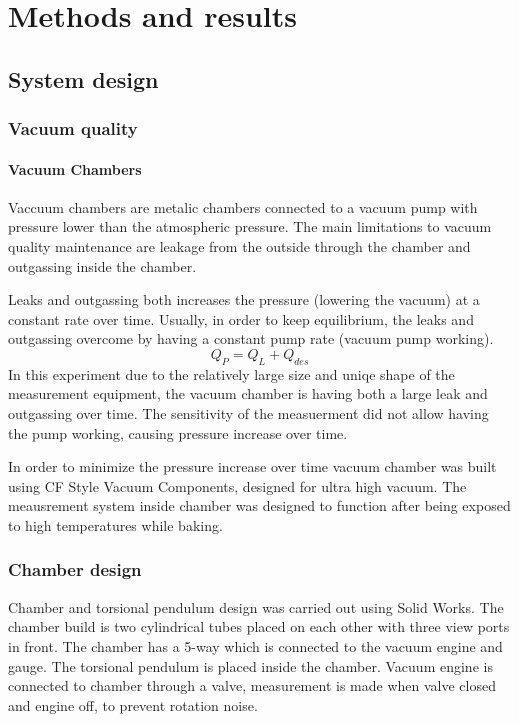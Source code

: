 \documentclass[\main/master.tex]{subfiles}
\begin{document}
\chapter{Methods and results}\label{chp:example-2}
\section{System design}
\subsection{Vacuum quality}

\subsubsection{Vacuum Chambers}
Vaccuum chambers are metalic chambers connected to a vacuum pump with pressure lower than the atmospheric pressure. The main limitations to vacuum quality maintenance are leakage from the outside through the chamber and outgassing inside the chamber.
\par\noindent
Leaks and outgassing both increases the pressure (lowering the vacuum) at a constant rate over time. Usually, in order to keep equilibrium, the leaks and outgassing overcome by having a constant pump rate (vacuum pump working).   
\begin{equation}
Q_P = Q_L + Q_{des}  \label{eqn:vacuum_equilibrium}
\end{equation}
In this experiment due to the relatively large size and uniqe shape of the measurement equipment, the vacuum chamber is having both a large leak and outgassing over time. The sensitivity of the measuerment did not allow having the pump working, causing pressure increase over time.
\par\noindent 
In order to minimize the pressure increase over time vacuum chamber was built using CF Style Vacuum Components, designed for ultra high vacuum. The meausrement system inside chamber was designed to function after being exposed to high temperatures while baking.
\subsection{Chamber design}

Chamber and torsional pendulum design was carried out using Solid Works. The chamber build is two cylindrical tubes placed on each other with three view ports in front. The chamber has a 5-way which is connected to the vacuum engine and gauge. The torsional pendulum is placed inside the chamber. Vacuum engine is connected to chamber through a valve, measurement is made when valve closed and engine off, to prevent rotation noise.
\end{document}
